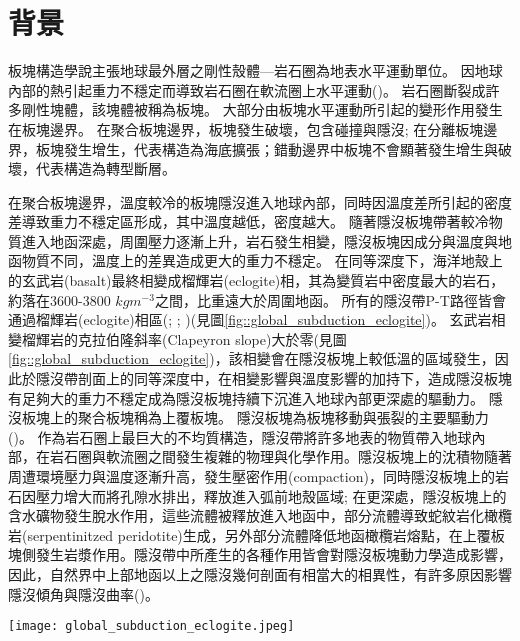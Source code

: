 \section{背景}\label{背景}

板塊構造學說主張地球最外層之剛性殼體---岩石圈為地表水平運動單位。
因地球內部的熱引起重力不穩定而導致岩石圈在軟流圈上水平運動(\citealp{jordan1978composition})。
岩石圈斷裂成許多剛性塊體，該塊體被稱為板塊。
大部分由板塊水平運動所引起的變形作用發生在板塊邊界。
在聚合板塊邊界，板塊發生破壞，包含碰撞與隱沒; 在分離板塊邊界，板塊發生增生，代表構造為海底擴張；錯動邊界中板塊不會顯著發生增生與破壞，代表構造為轉型斷層。

在聚合板塊邊界，溫度較冷的板塊隱沒進入地球內部，同時因溫度差所引起的密度差導致重力不穩定區形成，其中溫度越低，密度越大。
隨著隱沒板塊帶著較冷物質進入地函深處，周圍壓力逐漸上升，岩石發生相變，隱沒板塊因成分與溫度與地函物質不同，溫度上的差異造成更大的重力不穩定。
在同等深度下，海洋地殼上的玄武岩(basalt)最終相變成榴輝岩(eclogite)相，其為變質岩中密度最大的岩石，約落在3600-3800 $kg m^{-3}$之間，比重遠大於周圍地函。
所有的隱沒帶P-T路徑皆會通過榴輝岩(eclogite)相區(\citealp{gerya2002exhumation}; \citealp{syracuse2010global}; \citealp{penniston2015global})(見圖\ref{fig::global_subduction_eclogite})。
玄武岩相變榴輝岩的克拉伯隆斜率(Clapeyron slope)大於零(見圖\ref{fig::global_subduction_eclogite})，該相變會在隱沒板塊上較低溫的區域發生，因此於隱沒帶剖面上的同等深度中，在相變影響與溫度影響的加持下，造成隱沒板塊有足夠大的重力不穩定成為隱沒板塊持續下沉進入地球內部更深處的驅動力。
隱沒板塊上的聚合板塊稱為上覆板塊。
隱沒板塊為板塊移動與張裂的主要驅動力(\citealp{turcotte2002geodynamics})。
作為岩石圈上最巨大的不均質構造，隱沒帶將許多地表的物質帶入地球內部，在岩石圈與軟流圈之間發生複雜的物理與化學作用。隱沒板塊上的沈積物隨著周遭環境壓力與溫度逐漸升高，發生壓密作用(compaction)，同時隱沒板塊上的岩石因壓力增大而將孔隙水排出，釋放進入弧前地殼區域; 在更深處，隱沒板塊上的含水礦物發生脫水作用，這些流體被釋放進入地函中，部分流體導致蛇紋岩化橄欖岩(serpentinitzed peridotite)生成，另外部分流體降低地函橄欖岩熔點，在上覆板塊側發生岩漿作用。隱沒帶中所產生的各種作用皆會對隱沒板塊動力學造成影響，因此，自然界中上部地函以上之隱沒幾何剖面有相當大的相異性，有許多原因影響隱沒傾角與隱沒曲率(\citealp{schellart2020control})。

\begin{figure*}[ht!]
    \centering
    \texttt{[image: global\_subduction\_eclogite.jpeg]}
    \caption[全球隱沒板塊頂部的預測P-T路徑圖]{
    全球隱沒板塊頂部的預測P-T路徑圖，摘自\citealp{penniston2015global}。圖中標示每公里5$^\circ$、10$^\circ$、20$^\circ$的地溫梯度與藍閃岩、榴輝岩溫壓位置。(A)來自\citealp{syracuse2010global}的全球隱沒板塊P-T路徑圖(紫色線)。(B)來自\citealp{gerya2002exhumation}的模型，紅色線代表不同年齡的隱沒板塊P-T路徑圖。
    }
    \label{fig::global_subduction_eclogite}
\end{figure*}


